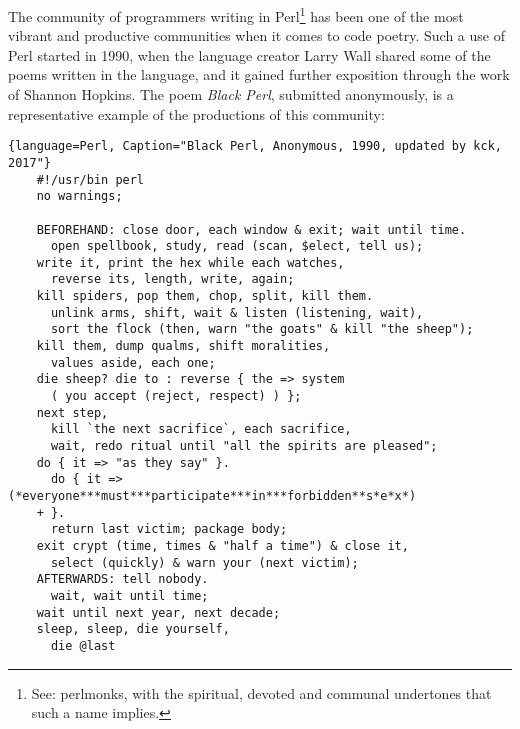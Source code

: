 \documentclass{article}
\begin{document}
The community of programmers writing in Perl\footnote{See: perlmonks, with the spiritual, devoted and communal undertones that such a name implies.} has been one of the most vibrant and productive communities when it comes to code poetry. Such a use of Perl started in 1990, when the language creator Larry Wall shared some of the poems written in the language, and it gained further exposition through the work of Shannon Hopkins\cite{hopkins_camels_1992}. The poem \emph{Black Perl}, submitted anonymously, is a representative example of the productions of this community:

\linespread{1.00}\selectfont
\begin{lstlisting}{language=Perl, Caption="Black Perl, Anonymous, 1990, updated by kck, 2017"}
    #!/usr/bin perl
    no warnings;
    
    BEFOREHAND: close door, each window & exit; wait until time.
      open spellbook, study, read (scan, $elect, tell us);
    write it, print the hex while each watches,
      reverse its, length, write, again;
    kill spiders, pop them, chop, split, kill them.
      unlink arms, shift, wait & listen (listening, wait),
      sort the flock (then, warn "the goats" & kill "the sheep");
    kill them, dump qualms, shift moralities,
      values aside, each one;
    die sheep? die to : reverse { the => system
      ( you accept (reject, respect) ) };
    next step,
      kill `the next sacrifice`, each sacrifice,
      wait, redo ritual until "all the spirits are pleased";
    do { it => "as they say" }.
      do { it => (*everyone***must***participate***in***forbidden**s*e*x*)
    + }.
      return last victim; package body;
    exit crypt (time, times & "half a time") & close it,
      select (quickly) & warn your (next victim);
    AFTERWARDS: tell nobody.
      wait, wait until time;
    wait until next year, next decade;
    sleep, sleep, die yourself,
      die @last 
\end{lstlisting}
\linespread{1.50}\selectfont
\normalfont
\end{document}
